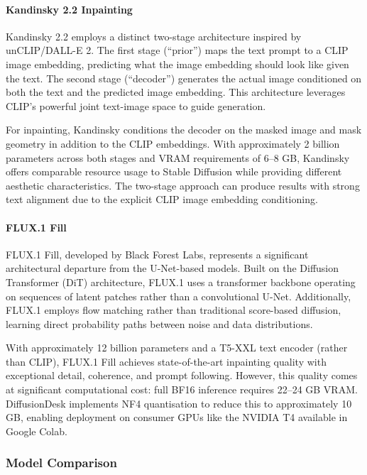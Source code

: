 \documentclass[12pt,a4paper]{report}
\begin{document}
\paragraph{Kandinsky 2.2 Inpainting}

Kandinsky 2.2 employs a distinct two-stage architecture inspired by unCLIP/DALL-E 2. The first stage (``prior'') maps the text prompt to a CLIP image embedding, predicting what the image embedding should look like given the text. The second stage (``decoder'') generates the actual image conditioned on both the text and the predicted image embedding. This architecture leverages CLIP's powerful joint text-image space to guide generation.

For inpainting, Kandinsky conditions the decoder on the masked image and mask geometry in addition to the CLIP embeddings. With approximately 2 billion parameters across both stages and VRAM requirements of 6--8 GB, Kandinsky offers comparable resource usage to Stable Diffusion while providing different aesthetic characteristics. The two-stage approach can produce results with strong text alignment due to the explicit CLIP image embedding conditioning.

\paragraph{FLUX.1 Fill}

FLUX.1 Fill, developed by Black Forest Labs, represents a significant architectural departure from the U-Net-based models. Built on the Diffusion Transformer (DiT) architecture, FLUX.1 uses a transformer backbone operating on sequences of latent patches rather than a convolutional U-Net. Additionally, FLUX.1 employs flow matching rather than traditional score-based diffusion, learning direct probability paths between noise and data distributions.

With approximately 12 billion parameters and a T5-XXL text encoder (rather than CLIP), FLUX.1 Fill achieves state-of-the-art inpainting quality with exceptional detail, coherence, and prompt following. However, this quality comes at significant computational cost: full BF16 inference requires 22--24 GB VRAM. DiffusionDesk implements NF4 quantisation to reduce this to approximately 10 GB, enabling deployment on consumer GPUs like the NVIDIA T4 available in Google Colab.

\subsubsection{Model Comparison}
\end{document}
